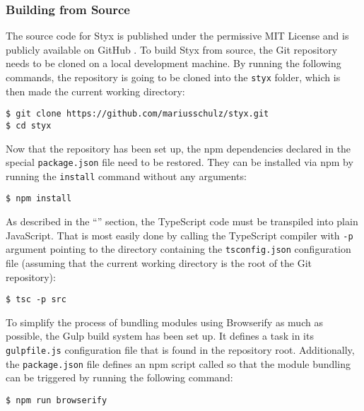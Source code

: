 \subsubsection{Building from Source}

The source code for Styx is published under the permissive MIT License \cite{mit-license} and is publicly available on GitHub \cite{styx-github}. To build Styx from source, the Git repository needs to be cloned on a local development machine. By running the following commands, the repository is going to be cloned into the \texttt{styx} folder, which is then made the current working directory:

\begin{verbatim}
$ git clone https://github.com/mariusschulz/styx.git
$ cd styx
\end{verbatim}

Now that the repository has been set up, the npm dependencies declared in the special \texttt{package.json} file need to be restored. They can be installed via npm by running the \texttt{install} command without any arguments:

\begin{verbatim}
$ npm install
\end{verbatim}

As described in the ``'' section, the TypeScript code must be transpiled into plain JavaScript. That is most easily done by calling the TypeScript compiler with \texttt{-p} argument pointing to the directory containing the \texttt{tsconfig.json} configuration file (assuming that the current working directory is the root of the Git repository):

\begin{verbatim}
$ tsc -p src
\end{verbatim}

To simplify the process of bundling modules using Browserify as much as possible, the Gulp \cite{gulp} build system has been set up. It defines a  task in its \texttt{gulpfile.js} configuration file that is found in the repository root. Additionally, the \texttt{package.json} file defines an npm script called  so that the module bundling can be triggered by running the following command:

\begin{verbatim}
$ npm run browserify
\end{verbatim}

